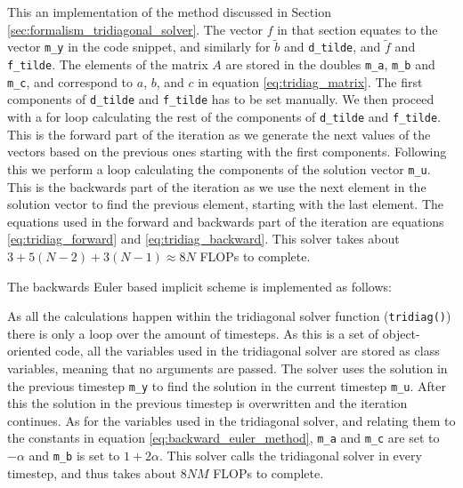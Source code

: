 \documentclass[reprint,english,notitlepage]{revtex4-1}  %
\begin{document}
This an implementation of the method discussed in Section \ref{sec:formalism_tridiagonal_solver}. The vector $f$ in that section equates to the vector \verb+m_y+ in the code snippet, and similarly for $\tilde{b}$ and \verb+d_tilde+, and $\tilde{f}$ and \verb+f_tilde+. The elements of the matrix $A$ are stored in the doubles \verb+m_a+, \verb+m_b+ and \verb+m_c+, and correspond to $a$, $b$, and $c$ in equation \eqref{eq:tridiag_matrix}. The first components of \verb+d_tilde+ and \verb+f_tilde+ has to be set manually. We then proceed with a for loop calculating the rest of the components of \verb+d_tilde+ and \verb+f_tilde+. This is the forward part of the iteration as we generate the next values of the vectors based on the previous ones starting with the first components. Following this we perform a loop calculating the components of the solution vector \verb+m_u+. This is the backwards part of the iteration as we use the next element in the solution vector to find the previous element, starting with the last element. The equations used in the forward and backwards part of the iteration are equations \eqref{eq:tridiag_forward} and \eqref{eq:tridiag_backward}. This solver takes about $3 + 5(N-2) + 3(N-1) \approx 8N$ FLOPs to complete. 

The backwards Euler based implicit scheme is implemented as follows:

\begin{cpp}
// Iterate over timesteps
for (int j = 1; j <= m_M; j++){
  // Use tridiagonal solver to move one step
  tridiag();

  // Set boundary conditions
  m_u(0) = m_lb;
  m_u(m_N) = m_ub;

  // Update previous solution
  m_y = m_u;
  }
}
\end{cpp}  

As all the calculations happen within the tridiagonal solver function (\verb+tridiag()+) there is only a loop over the amount of timesteps. As this is a set of object-oriented code, all the variables used in the tridiagonal solver are stored as class variables, meaning that no arguments are passed. The solver uses the solution in the previous timestep \verb+m_y+ to find the solution in the current timestep \verb+m_u+. After this the solution in the previous timestep is overwritten and the iteration continues. As for the variables used in the tridiagonal solver, and relating them to the constants in equation \eqref{eq:backward_euler_method}, \verb+m_a+ and \verb+m_c+ are set to $-\alpha$ and \verb+m_b+ is set to $1 + 2\alpha$. This solver calls the tridiagonal solver in every timestep, and thus takes about $8NM$ FLOPs to complete.
\end{document}
